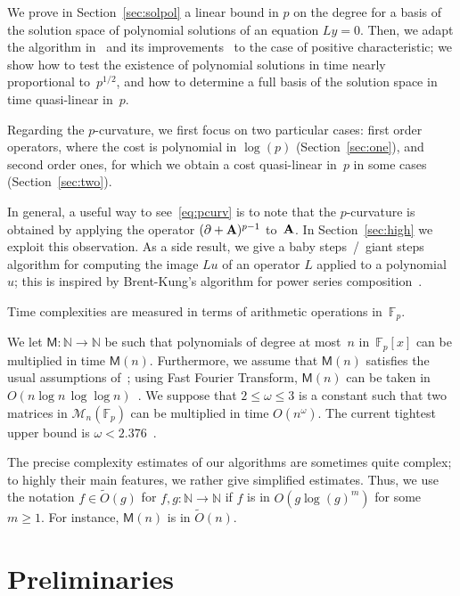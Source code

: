 \documentclass{sig-alternate}
\newcommand{\bigOsoft}{\tilde{O}}
\def\N {\mathbb{N}}
\def\F {\mathbb{F}}
\def\M{\ensuremath{\mathsf{M}}}
\def\mA {\ensuremath{{\bf A}}}
\begin{document}
\smallskip{}  We prove in
Section~\ref{sec:solpol} a linear bound in $p$ on the degree for a
basis of the solution space of polynomial solutions of an equation
$Ly=0$. Then, we adapt the algorithm in~\cite{AbBrPe95} and its
improvements~\cite{BoClSa05} to the case of positive characteristic;
we show how to test the existence of polynomial solutions in time
nearly proportional to~$p^{1/2}$, and how to determine a full basis of the solution
space in time quasi-linear in~$p$.

Regarding the $p$-curvature, we first focus on two particular cases:
first order operators, where the cost is polynomial in $\log(p)$
(Section~\ref{sec:one}), and second order ones, for which we obtain a
cost quasi-linear in~$p$ in some cases 
(Section~\ref{sec:two}).

In general, a useful way to see~\eqref{eq:pcurv} is to note that the
$p$-curvature is obtained by applying the operator
$(\partial+\mA)^{p-1}$ to~$\mA$. In Section~\ref{sec:high} we exploit
this observation. As a side result, we give a baby steps~/~giant steps
algorithm for computing the image $Lu$ of an operator $L$ applied to a
polynomial $u$; this is inspired by Brent-Kung's algorithm for power
series composition~\cite{BrKu78}.

\smallskip{} Time complexities are
measured in terms of arithmetic operations in~$\F_p$. 

We let $\M: \N \rightarrow \N$ be such that polynomials of degree at
most~$n$ in~$\F_p[x]$ can be multiplied in time $\M(n)$. Furthermore,
we assume that $\M(n)$ satisfies the usual assumptions
of~\cite[\S8.3]{GaGe99}; using Fast Fourier Transform, $\M(n)$ can be
taken in $O(n \log n\,\log\log n)$~\cite{ScSt71,CaKa91}.  We suppose
that $2\leq \omega \le 3$ is a constant such that two matrices in
$\mathscr{M}_n(\F_p)$ can be multiplied in time $O(n^\omega)$. The
current tightest upper bound is $\omega < 2.376$~\cite{CoWi90}.

The precise complexity estimates of our algorithms are sometimes
quite complex; to highly their main features, we rather give
simplified estimates. Thus, we use the notation $f \in \bigOsoft(g)$
for $f,g:\N \rightarrow \N$ if $f$ is in $O(g \log(g)^m)$ for some
$m\geq 1$. For instance, $\M(n)$ is in $\bigOsoft(n)$.



\section{Preliminaries}
\end{document}
